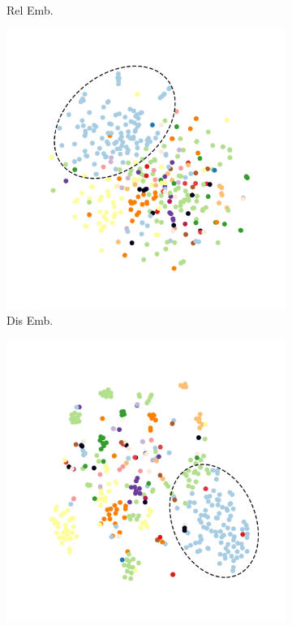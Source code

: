 \documentclass[letterpaper]{article}
\begin{document}
\begin{figure}[t]
\begin{subfigure}{.24\textwidth}
			\caption{Rel Emb.}
			\label{fig:subfig:b}
		\end{subfigure}
		\begin{subfigure}{.24\textwidth}
			\centering
			\includegraphics[width=\textwidth]{Yang_Liu_dis_new.pdf}
			\caption{Dis Emb.}
			\label{fig:subfig:c}
		\end{subfigure}
		\begin{subfigure}{.24\textwidth}
			\centering
			\includegraphics[width=\textwidth]{Yang_Liu_gen_new.pdf}

\end{subfigure}
\end{figure}
\end{document}
